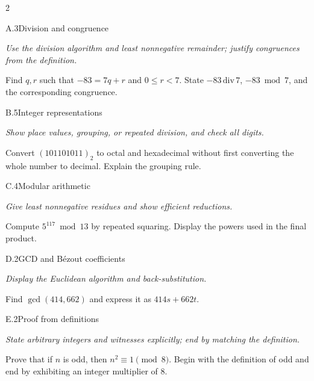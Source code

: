 \documentclass[9pt]{extarticle}
\begin{document}
\begin{multicols}{2}
\begin{CoreProblem}{A.3}{Division and congruence}
{\scriptsize\textit{Use the division algorithm and least nonnegative remainder; justify congruences from the definition.}\par}
Find $q,r$ such that $-83=7q+r$ and $0\le r<7$. State
$-83\,\mathrm{div}\,7$, $-83\bmod7$, and the corresponding congruence.
\end{CoreProblem}
\begin{CoreProblem}{B.5}{Integer representations}
{\scriptsize\textit{Show place values, grouping, or repeated division, and check all digits.}\par}
Convert $(101101011)_2$ to octal and hexadecimal without first converting the
whole number to decimal. Explain the grouping rule.
\end{CoreProblem}
\begin{CoreProblem}{C.4}{Modular arithmetic}
{\scriptsize\textit{Give least nonnegative residues and show efficient reductions.}\par}
Compute $5^{117}\bmod13$ by repeated squaring. Display the powers used in the
final product.
\end{CoreProblem}
\columnbreak
\begin{CoreProblem}{D.2}{GCD and B\'ezout coefficients}
{\scriptsize\textit{Display the Euclidean algorithm and back-substitution.}\par}
Find $\gcd(414,662)$ and express it as $414s+662t$.
\end{CoreProblem}
\begin{CoreProblem}{E.2}{Proof from definitions}
{\scriptsize\textit{State arbitrary integers and witnesses explicitly; end by matching the definition.}\par}
Prove that if $n$ is odd, then $n^2\equiv1\pmod{8}$. Begin with the definition
of odd and end by exhibiting an integer multiplier of $8$.
\end{CoreProblem}
\end{multicols}
\CoreWorkArea
\FormBreak
{}
\end{document}
